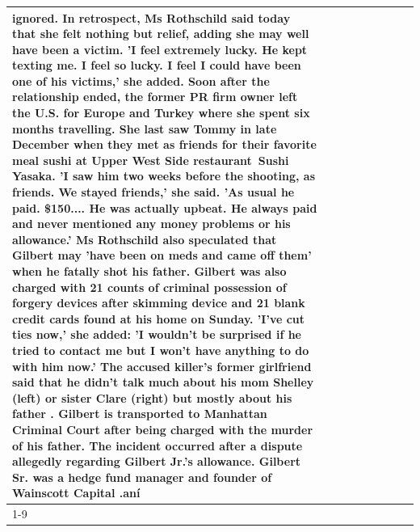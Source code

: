 \begin{table}[H]
\begin{tabular}{lllrlllll}
ignored. In retrospect, Ms Rothschild said today that she felt nothing but relief, adding she may well have been a victim. 'I feel extremely lucky. He kept texting me. I feel so lucky. I feel I could have been one of his victims,' she added. Soon after the relationship ended, the former PR firm owner left the U.S. for Europe and Turkey where she spent six months  travelling. She last saw Tommy in late December when they met as friends for their favorite meal sushi at Upper West Side restaurant Sushi Yasaka. 'I saw him two weeks before the shooting, as friends. We stayed friends,' she said. 'As usual he paid. \$150.... He was actually upbeat. He always paid and never mentioned any money problems or his allowance.' Ms Rothschild also speculated that Gilbert may 'have been on meds and came off them' when he fatally shot his father. Gilbert was also charged with 21 counts of criminal possession of forgery devices after skimming device and 21 blank credit cards found at his home on Sunday. 'I've cut ties now,' she added: 'I wouldn’t be surprised if he tried to contact me but I won’t have anything to do with him now.' The accused killer's former girlfriend said that he didn't talk much about his mom Shelley (left) or sister Clare (right) but mostly about his father . Gilbert is transported to Manhattan Criminal Court  after being charged with the murder of his father. The incident occurred after a dispute allegedly regarding Gilbert Jr.'s allowance. Gilbert Sr. was a hedge fund manager and founder of Wainscott Capital .aní \\
\cline{1-9}

\end{tabular}
\end{table}
